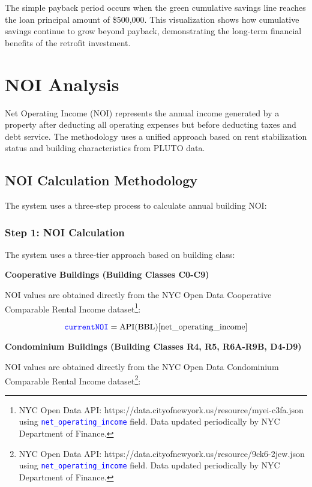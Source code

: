 \documentclass{article}
\newcommand{\code}[1]{\textcolor{blue}{\texttt{#1}}}
\begin{document}
The simple payback period occurs when the green cumulative savings line reaches the loan principal amount of \$500,000. This visualization shows how cumulative savings continue to grow beyond payback, demonstrating the long-term financial benefits of the retrofit investment.

\section{NOI Analysis}

Net Operating Income (NOI) represents the annual income generated by a property after deducting all operating expenses but before deducting taxes and debt service. The methodology uses a unified approach based on rent stabilization status and building characteristics from PLUTO data.

\subsection{NOI Calculation Methodology}

The system uses a three-step process to calculate annual building NOI:

\subsubsection{Step 1: NOI Calculation}

The system uses a three-tier approach based on building class:

\textbf{Cooperative Buildings (Building Classes C0-C9)}

NOI values are obtained directly from the NYC Open Data Cooperative Comparable Rental Income dataset\footnote{NYC Open Data API: https://data.cityofnewyork.us/resource/myei-c3fa.json using \code{net\_operating\_income} field. Data updated periodically by NYC Department of Finance.}:

\begin{equation}
\code{currentNOI} = \text{API}(\text{BBL})[\text{net\_operating\_income}]
\end{equation}

\textbf{Condominium Buildings (Building Classes R4, R5, R6A-R9B, D4-D9)}

NOI values are obtained directly from the NYC Open Data Condominium Comparable Rental Income dataset\footnote{NYC Open Data API: https://data.cityofnewyork.us/resource/9ck6-2jew.json using \code{net\_operating\_income} field. Data updated periodically by NYC Department of Finance.}:
\end{document}
